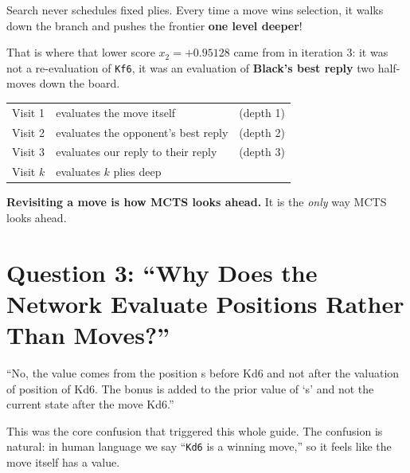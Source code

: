 \begin{center}
\begin{minipage}{\linewidth}
\centering

\label{fig:depth}
\end{minipage}
\end{center}

\begin{keyidea}[title={Depth Is Emergent}]
Search never schedules fixed plies. Every time a move wins selection, it walks down the branch and pushes the frontier \textbf{one level deeper}!
\end{keyidea}

That is where that lower score $x_2 = +0.95128$ came from in iteration 3: it was not a re-evaluation of \texttt{Kf6}, it was an evaluation of \textbf{Black's best reply} two half-moves down the board.

\begin{center}
\begin{tabular}{lll}
  \toprule
  Visit 1 & evaluates the move itself & (depth 1) \\
  Visit 2 & evaluates the opponent's best reply & (depth 2) \\
  Visit 3 & evaluates our reply to their reply & (depth 3) \\
  Visit $k$ & evaluates $k$ plies deep \\
  \bottomrule
\end{tabular}
\end{center}

\textbf{Revisiting a move is how MCTS looks ahead.} It is the \textit{only} way MCTS looks ahead.

\section{Question 3: ``Why Does the Network Evaluate Positions Rather Than Moves?''}

\begin{studentq}
``No, the value comes from the position s before Kd6 and not after the valuation of position of Kd6. The bonus is added to the prior value of `s' and not the current state after the move Kd6.''
\end{studentq}

This was the core confusion that triggered this whole guide. The confusion is natural: in human language we say ``\texttt{Kd6} is a winning move,'' so it feels like the move itself has a value.

